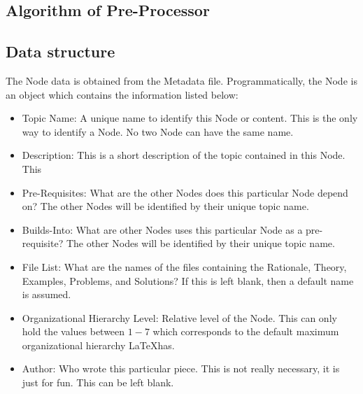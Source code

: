\documentclass[a4paper, 12pt]{report}
\begin{document}
\begin{center}
\section{Algorithm of Pre-Processor}
\begin{comment}
\end{comment}

\subsection{Data structure}
\begin{comment}
\end{comment}
The Node data is obtained from the Metadata file. Programmatically, the Node is an object which contains the information listed below:
\begin{itemize}
\item Topic Name: A unique name to identify this Node or content. This is the only way to identify a Node. No two Node can have the same name.
\item Description: This is a short description of the topic contained in this Node. This 
\item Pre-Requisites: What are the other Nodes does this particular Node depend on? The other Nodes will be identified by their unique topic name.
\item Builds-Into: What are other Nodes uses this particular Node as a pre-requisite? The other Nodes will be identified by their unique topic name.
\item File List: What are the names of the files containing the Rationale, Theory, Examples, Problems, and Solutions? If this is left blank, then a default name is assumed.
\item Organizational Hierarchy Level: Relative level of the Node. This can only hold the values between $1-7$ which corresponds to the default maximum organizational hierarchy \LaTeX has.
\item Author: Who wrote this particular piece. This is not really necessary, it is just for fun. This can be left blank.
\end{itemize}


\end{center}
\end{document}
